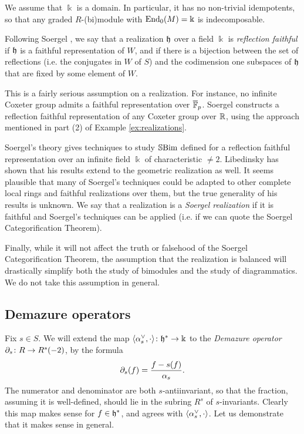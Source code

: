 We assume that $\Bbbk$ is a domain. In particular, it has no non-trivial idempotents, so that any graded $R$-(bi)module with $\operatorname{End}_0(M) = \Bbbk$ is indecomposable.

\begin{defn} Following Soergel \cite{Soe3}, we say that a realization ${\mathfrak h}$ over a field $\Bbbk$ is \emph{reflection faithful} if ${\mathfrak h}$ is a faithful representation of $W$, and if there is
a bijection between the set of reflections (i.e. the conjugates in $W$ of $S$) and the codimension one subspaces of ${\mathfrak h}$ that are fixed by some element of $W$. \end{defn}

This is a fairly serious assumption on a realization. For instance, no infinite Coxeter group admits a faithful representation over $\overline{{\mathbb{F}}}_p$. Soergel constructs a reflection
faithful representation of any Coxeter group over ${\mathbb{R}}$, using the approach mentioned in part (2) of Example \ref{ex:realizations}.

Soergel's theory gives techniques to study $\mathbb{S}\textrm{Bim}$ defined for a reflection faithful representation over an infinite field $\Bbbk$ of characteristic $\ne 2$. Libedinsky \cite{Lib} has
shown that his results extend to the geometric realization as well. It seems plausible that many of Soergel's techniques could be adapted to other complete local rings and faithful
realizations over them, but the true generality of his results is unknown. We say that a realization is a \emph{Soergel realization} if it is faithful and Soergel's techniques can be
applied (i.e. if we can quote the Soergel Categorification Theorem).

Finally, while it will not affect the truth or falsehood of the Soergel Categorification Theorem, the assumption that the realization is balanced will drastically simplify both the study
of bimodules and the study of diagrammatics. We do not take this assumption in general.

\subsection{Demazure operators}
\label{subsec-polys}

Fix $s \in S$. We will extend the map $\langle \alpha_s^\vee, \cdot \rangle \colon {\mathfrak h}^* \rightarrow \Bbbk$ to the \emph{Demazure operator} $\partial_s \colon R \rightarrow R^s(-2)$, by the formula 
\[
\partial_s(f) = \frac{f - s(f)}{\alpha_s}.
\]
The numerator and denominator are both $s$-antiinvariant, so that the fraction, assuming it is well-defined, should lie in the subring $R^s$ of $s$-invariants.
Clearly this map makes sense for $f \in {\mathfrak h}^*$, and agrees with $\langle \alpha_s^\vee, \cdot \rangle$. Let us demonstrate that it makes sense in general.

